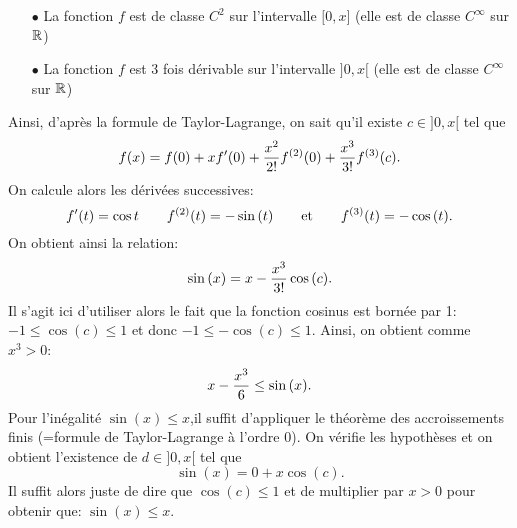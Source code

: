 \documentclass[a4paper, 11pt,reqno]{article}
\begin{document}
\begin{correction}
\begin{enumerate}
\begin{itemize}
			      \item[$\bullet$] La fonction $f$ est de classe $C^2$ sur l'intervalle $\lbrack 0,x\rbrack$ (elle est de classe $C^{\infty}$ sur $\mathbb{R}$)
			      \item[$\bullet$]  La fonction $f$ est $3$ fois d\'erivable sur l'intervalle $\rbrack 0,x\lbrack$ (elle est de classe $C^{\infty}$ sur $\mathbb{R}$)
		      \end{itemize}
		      Ainsi, d'apr\`es la formule de Taylor-Lagrange, on sait qu'il existe $c\in\rbrack 0,x\lbrack$ tel que
		      $$f(x)=f(0)+xf^{\prime}(0)+\displaystyle\frac{x^2}{2!}f^{(2)}(0)+\displaystyle\frac{x^3}{3!}f^{(3)}(c).$$
		      On calcule alors les d\'eriv\'ees successives:
		      $$f^{\prime}(t)=\cos{t}\qquad f^{(2)}(t)=-\sin{(t)}\qquad \hbox{et}\qquad f^{(3)}(t)=-\cos{(t)}.$$
		      On obtient ainsi la relation:
		      $$\sin{(x)}=x-\displaystyle\frac{x^3}{3!}\cos{(c)}.$$
		      Il s'agit ici d'utiliser alors le fait que la fonction cosinus est born\'ee par 1: $-1\leq \cos{(c)}\leq 1$ et donc $-1\leq -\cos{(c)}\leq 1$. Ainsi, on obtient comme $x^3>0$:
		      $$x-\displaystyle\frac{x^3}{6}\leq\sin{(x)}.$$
		      Pour l'in\'egalit\'e $\sin{(x)}\leq x$,il suffit d'appliquer le th\'eor\`eme des accroissements finis (=formule de Taylor-Lagrange \`a l'ordre 0). On v\'erifie les hypoth\`eses et on obtient l'existence de $d\in\rbrack 0,x\lbrack$ tel que
		      $$\sin{(x)}=0+x\cos{(c)}.$$
		      Il suffit alors juste de dire que $\cos{(c)}\leq 1$ et de multiplier par $x>0$ pour obtenir que: $\sin{(x)}\leq x$.
	\end{enumerate}
\end{correction}
\end{document}
